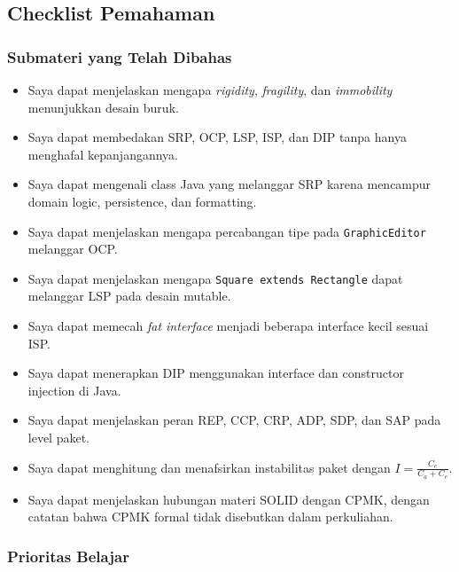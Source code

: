 \subsection{Checklist Pemahaman}

\subsubsection{Submateri yang Telah Dibahas}

\begin{itemize}
    \item[$\square$] Saya dapat menjelaskan mengapa \textit{rigidity}, \textit{fragility}, dan \textit{immobility} menunjukkan desain buruk.
    \item[$\square$] Saya dapat membedakan SRP, OCP, LSP, ISP, dan DIP tanpa hanya menghafal kepanjangannya.
    \item[$\square$] Saya dapat mengenali class Java yang melanggar SRP karena mencampur domain logic, persistence, dan formatting.
    \item[$\square$] Saya dapat menjelaskan mengapa percabangan tipe pada \texttt{GraphicEditor} melanggar OCP.
    \item[$\square$] Saya dapat menjelaskan mengapa \texttt{Square extends Rectangle} dapat melanggar LSP pada desain mutable.
    \item[$\square$] Saya dapat memecah \textit{fat interface} menjadi beberapa interface kecil sesuai ISP.
    \item[$\square$] Saya dapat menerapkan DIP menggunakan interface dan constructor injection di Java.
    \item[$\square$] Saya dapat menjelaskan peran REP, CCP, CRP, ADP, SDP, dan SAP pada level paket.
    \item[$\square$] Saya dapat menghitung dan menafsirkan instabilitas paket dengan $I = \frac{C_e}{C_a + C_e}$.
    \item[$\square$] Saya dapat menjelaskan hubungan materi SOLID dengan CPMK, dengan catatan bahwa CPMK formal tidak disebutkan dalam perkuliahan.
\end{itemize}

\subsubsection{Prioritas Belajar}

